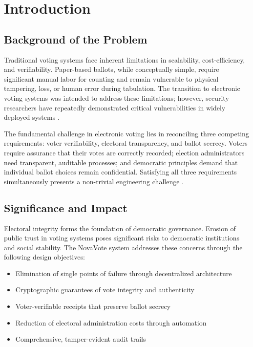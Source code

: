 \documentclass[conference]{IEEEtran}
\begin{document}
\section{Introduction}

\subsection{Background of the Problem}
Traditional voting systems face inherent limitations in scalability, cost-efficiency, and verifiability. Paper-based ballots, while conceptually simple, require significant manual labor for counting and remain vulnerable to physical tampering, loss, or human error during tabulation. The transition to electronic voting systems was intended to address these limitations; however, security researchers have repeatedly demonstrated critical vulnerabilities in widely deployed systems \cite{voting_security}.

The fundamental challenge in electronic voting lies in reconciling three competing requirements: voter verifiability, electoral transparency, and ballot secrecy. Voters require assurance that their votes are correctly recorded; election administrators need transparent, auditable processes; and democratic principles demand that individual ballot choices remain confidential. Satisfying all three requirements simultaneously presents a non-trivial engineering challenge \cite{zkp_voting}.

\subsection{Significance and Impact}
Electoral integrity forms the foundation of democratic governance. Erosion of public trust in voting systems poses significant risks to democratic institutions and social stability. The NovaVote system addresses these concerns through the following design objectives:

\begin{itemize}
    \item Elimination of single points of failure through decentralized architecture
    \item Cryptographic guarantees of vote integrity and authenticity
    \item Voter-verifiable receipts that preserve ballot secrecy
    \item Reduction of electoral administration costs through automation
    \item Comprehensive, tamper-evident audit trails
\end{itemize}
\end{document}
